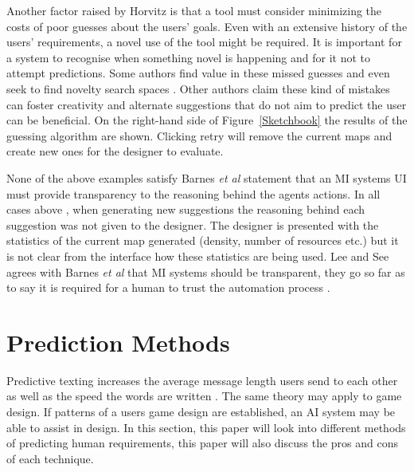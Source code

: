\documentclass[journal]{IEEEtran}
\begin{document}
Another factor raised by Horvitz \cite{horvitz1999principles} is that a tool must consider minimizing the costs of poor guesses about the users' goals. Even with an extensive history of the users' requirements, a novel use of the tool might be required. It is important for a system to recognise when something novel is happening and for it not to attempt predictions. Some authors find value in these missed guesses and even seek to find novelty search spaces \cite{liapis2013sentient}. Other authors \cite{liapis2016can,alvarez2018fostering, yannakakis2014mixed} claim these kind of mistakes can foster creativity and alternate suggestions that do not aim to predict the user can be beneficial. On the right-hand side of Figure~\ref{Sketchbook} the results of the guessing algorithm are shown. Clicking retry will remove the current maps and create new ones for the designer to evaluate.

None of the above examples \cite{alvarez2018fostering, liapis2013sentient, baldwin2017mixed} satisfy Barnes \textit{et al}\cite{barnes2015designing} statement that an MI systems UI must provide transparency to the reasoning behind the agents actions. In all cases above\cite{alvarez2018fostering, liapis2013sentient, baldwin2017mixed} , when generating new suggestions the reasoning behind each suggestion was not given to the designer. The designer is presented with the statistics of the current map generated (density, number of resources etc.) but it is not clear from the interface how these statistics are being used. Lee and See\cite{lee2004trust} agrees with Barnes \textit{et al}\cite{barnes2015designing} that MI systems should be transparent, they go so far as to say it is required for a human to trust the automation process \cite{lee2004trust}.

\section{Prediction Methods} \label{prediction}
Predictive texting increases the average message length users send to each other \cite{ling2005length} as well as the speed the words are written \cite{dunlop2000predictive}. The same theory may apply to game design. If patterns of a users game design are established, an AI system may be able to assist in design. In this section, this paper will look into different methods of predicting human requirements, this paper will also discuss the pros and cons of each technique.
\end{document}
